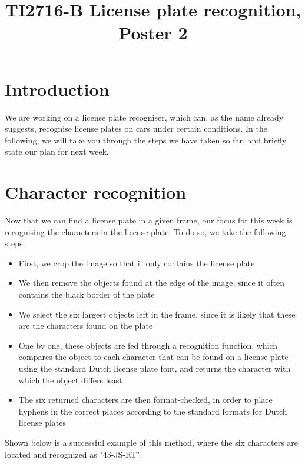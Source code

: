 \documentclass{tudelftposter}
\title{TI2716-B License plate recognition, Poster 2}
\begin{document}
\maketitle
\section{Introduction}
We are working on a license plate recogniser, which can, as the name already suggests, recognise license plates on cars under certain conditions. In the following, we will take you through the steps we have taken so far, and briefly state our plan for next week. 

\section{Character recognition}
Now that we can find a license plate in a given frame, our focus for this week is recognising the characters in the license plate. To do so, we take the following steps:
\begin{itemize}
\item First, we crop the image so that it only contains the license plate
\item We then remove the objects found at the edge of the image, since it often contains the black border of the plate
\item We select the six largest objects left in the frame, since it is likely that these are the characters found on the plate
\item One by one, these objects are fed through a recognition function, which compares the object to each character that can be found on a license plate using the standard Dutch license plate font, and returns the character with which the object differs least
\item The six returned characters are then format-checked, in order to place hyphens in the correct places according to the standard formats for Dutch license plates
\end{itemize}
Shown below is a successful example of this method, where the six characters are located and recognized as "43-JS-RT".
\end{document}
